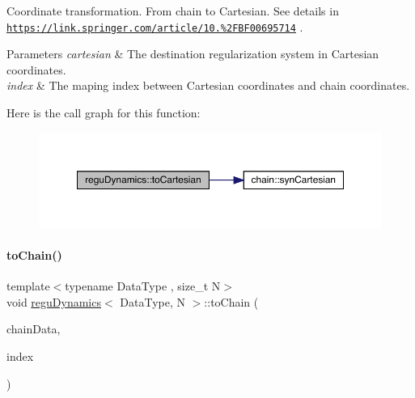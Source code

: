 Coordinate transformation. From chain to Cartesian. See details in \href{https://link.springer.com/article/10.1007%2FBF00695714}{\tt https\+://link.\+springer.\+com/article/10.\%2\+F\+B\+F00695714} . 
\begin{DoxyParams}{Parameters}
{\em cartesian} & The destination regularization system in Cartesian coordinates. \\
\hline
{\em index} & The maping index between Cartesian coordinates and chain coordinates. \\
\hline
\end{DoxyParams}
Here is the call graph for this function\+:\nopagebreak
\begin{figure}[H]
\begin{center}
\leavevmode
\includegraphics[width=350pt]{classregu_dynamics_a3dd8d377588308a02396ca6d06945859_cgraph}
\end{center}
\end{figure}
\mbox{\label{classregu_dynamics_aae4e77bbbb00f0bdddb396047f1c0fc2}} 
\paragraph{\texorpdfstring{to\+Chain()}{toChain()}}
{\footnotesize\ttfamily template$<$typename Data\+Type , size\+\_\+t N$>$ \\
void \mbox{\hyperlink{classregu_dynamics}{regu\+Dynamics}}$<$ Data\+Type, N $>$\+::to\+Chain (\begin{DoxyParamCaption}\item[{\mbox{\hyperlink{classregu_dynamics}{regu\+Dynamics}}$<$ Data\+Type, N $>$ \&}]{chain\+Data,  }\item[{\mbox{\hyperlink{classregu_dynamics_a2c9fa7372e4a11be9d85728b4a0e455f}{Index\+Array}} \&}]{index }\end{DoxyParamCaption})\hspace{0.3cm}{\ttfamily [inline]}}




